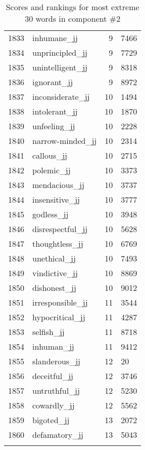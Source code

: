 \begin{longtable}[!htbp]{| rlr@{.}l |}
    1833 & inhumane\_jj & 9 & 7466 \\
    1834 & unprincipled\_jj & 9 & 7729 \\
    1835 & unintelligent\_jj & 9 & 8318 \\
    1836 & ignorant\_jj & 9 & 8972 \\
    1837 & inconsiderate\_jj & 10 & 1494 \\
    1838 & intolerant\_jj & 10 & 1870 \\
    1839 & unfeeling\_jj & 10 & 2228 \\
    1840 & narrow-minded\_jj & 10 & 2314 \\
    1841 & callous\_jj & 10 & 2715 \\
    1842 & polemic\_jj & 10 & 3373 \\
    1843 & mendacious\_jj & 10 & 3737 \\
    1844 & insensitive\_jj & 10 & 3777 \\
    1845 & godless\_jj & 10 & 3948 \\
    1846 & disrespectful\_jj & 10 & 5628 \\
    1847 & thoughtless\_jj & 10 & 6769 \\
    1848 & unethical\_jj & 10 & 7493 \\
    1849 & vindictive\_jj & 10 & 8869 \\
    1850 & dishonest\_jj & 10 & 9012 \\
    1851 & irresponsible\_jj & 11 & 3544 \\
    1852 & hypocritical\_jj & 11 & 4287 \\
    1853 & selfish\_jj & 11 & 8718 \\
    1854 & inhuman\_jj & 11 & 9412 \\
    1855 & slanderous\_jj & 12 & 20 \\
    1856 & deceitful\_jj & 12 & 3746 \\
    1857 & untruthful\_jj & 12 & 5230 \\
    1858 & cowardly\_jj & 12 & 5562 \\
    1859 & bigoted\_jj & 13 & 2072 \\
    1860 & defamatory\_jj & 13 & 5043 \\
    \hline
    \caption{Scores and rankings for most extreme 30 words in component \#2} \\
\end{longtable}
